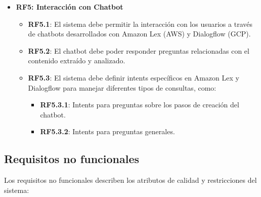 \begin{itemize}
    \item \textbf{RF5: Interacción con Chatbot}
    \begin{itemize}
        \item \textbf{RF5.1}: El sistema debe permitir la interacción con los usuarios a través de chatbots desarrollados con Amazon Lex (AWS) y Dialogflow (GCP).
        \item \textbf{RF5.2}: El chatbot debe poder responder preguntas relacionadas con el contenido extraído y analizado.
        \item \textbf{RF5.3}: El sistema debe definir intents específicos en Amazon Lex y Dialogflow para manejar diferentes tipos de consultas, como:
        \begin{itemize}
            \item \textbf{RF5.3.1}: Intents para preguntas sobre los pasos de creación del chatbot.
            \item \textbf{RF5.3.2}: Intents para preguntas generales.
        \end{itemize}
    \end{itemize}
    
\end{itemize}


\subsection{Requisitos no funcionales}

Los requisitos no funcionales describen los atributos de calidad y restricciones del sistema:

